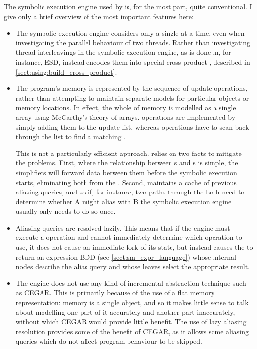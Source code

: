 The symbolic execution engine used by {\implementation} is, for the
most part, quite conventional.  I give only a brief overview of the
most important features here:
\begin{itemize}
\item The symbolic execution engine considers only a single
  {\StateMachine} at a time, even when investigating the parallel
  behaviour of two threads.  Rather than investigating thread
  interleavings in the symbolic execution engine, as is done in, for
  instance, ESD\cite{Zamfir2010}, {\technique} instead encodes them
  into special cross-product {\StateMachines}, described in
  \autoref{sect:using:build_cross_product}.

\item The program's memory is represented by the sequence of update
  operations, rather than attempting to maintain separate models for
  particular objects or memory locations.  In effect, the whole of
  memory is modelled as a single array using McCarthy's theory of
  arrays\needCite{}.   operations are implemented by
  simply adding them to the update list, whereas 
  operations have to scan back through the list to find a matching
  .

  This is not a particularly efficient approach.  {\Implementation}
  relies on two facts to mitigate the problems.  First, where the
  relationship between s and s is simple,  the
  {\StateMachine} simplifiers will forward data between them before
  the symbolic execution starts, eliminating both from the
  {\StateMachine}.  Second, {\implementation} maintains a cache of
  previous aliasing queries, and so if, for instance, two paths
  through the {\StateMachine} both need to determine whether
   A might alias with  B the symbolic
  execution engine usually only needs to do so once.

\item Aliasing queries are resolved lazily.  This means that if the
  engine must execute a  operation and cannot immediately
  determine which  operation to use, it does not cause an
  immediate fork of its state, but instead causes the  to
  return an expression BDD (see \autoref{sect:sm_expr_language}) whose
  internal nodes describe the alias query and whose leaves select the
  appropriate result.

\item The engine does not use any kind of incremental abstraction
  technique such as CEGAR\cite{Clarke2000}.  This is primarily because
  of the use of a flat memory representation: memory is a single
  object, and so it makes little sense to talk about modelling one
  part of it accurately and another part inaccurately, without which
  CEGAR would provide little benefit.  The use of lazy aliasing
  resolution provides some of the benefit of CEGAR, as it allows some
  aliasing queries which do not affect program behaviour to be
  skipped.


\end{itemize}
